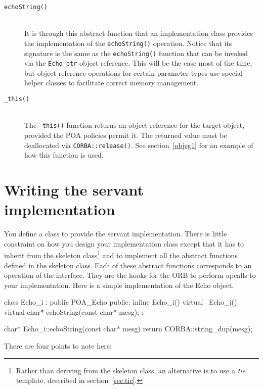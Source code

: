 \documentclass[11pt,twoside,a4paper]{book}
\newcommand{\type}[1]{\texttt{#1}}
\newcommand{\op}[1]{\texttt{#1()}}
\newcommand{\term}[1]{\textit{#1}}
\newcommand{\dsc}{\discretionary{}{}{}}
\begin{document}
\begin{description}

\item[\op{echoString}]\mbox{}\\
%
It is through this abstract function that an implementation class
provides the implementation of the \op{echoString} operation. Notice
that its signature is the same as the \op{echoString} function that
can be invoked via the \type{Echo\_ptr} object reference. This will be
the case most of the time, but object reference operations for certain
parameter types use special helper classes to facilitate correct
memory management.

\item[\op{\_this}]\mbox{}\\
%
The \op{\_this} function returns an object reference for the target
object, provided the POA policies permit it. The returned value must
be deallocated via \op{CORBA::\dsc{}release}.  See
section~\ref{objeg1} for an example of how this function is used.

\end{description}


\section{Writing the servant implementation}
\label{objimpl}

You define a class to provide the servant implementation. There is
little constraint on how you design your implementation class except
that it has to inherit from the skeleton class\footnote{Rather than
  deriving from the skeleton class, an alternative is to use a
  \term{tie} template, described in section~\ref{sec:tie}.} and to
implement all the abstract functions defined in the skeleton
class. Each of these abstract functions corresponds to an operation of
the interface. They are the hooks for the ORB to perform upcalls to
your implementation. Here is a simple implementation of the Echo
object.

\begin{cxxlisting}
class Echo_i : public POA_Echo
{
public:
  inline Echo_i() {}
  virtual ~Echo_i() {}
  virtual char* echoString(const char* mesg);
};

char* Echo_i::echoString(const char* mesg)
{
  return CORBA::string_dup(mesg);
}
\end{cxxlisting}

\noindent There are four points to note here:
\end{document}
